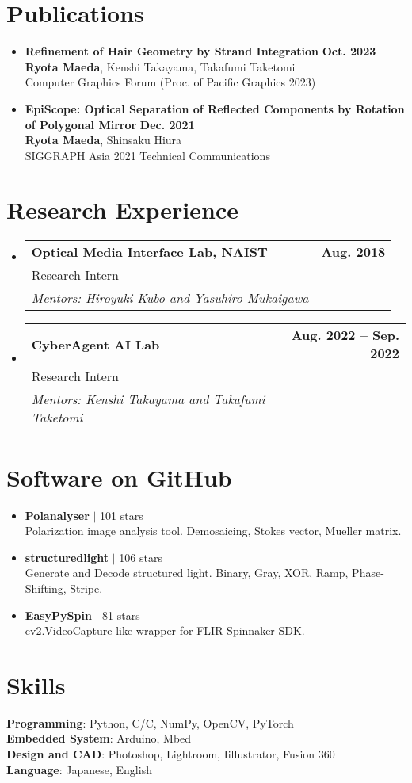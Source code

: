 \documentclass[letterpaper,11pt]{article}
\makeatletter
\newcommand{\resumeSubheadingWithAdvisor}[4]{
  \vspace{-2pt}\item
    \begin{tabular*}{1.0\textwidth}[t]{l@{\extracolsep{\fill}}r}
      \textbf{#1} & \textbf{\small #2} \\
      {\small#3} &  \\
      \textit{\small#4} &  \\
    \end{tabular*}\vspace{-7pt}
}
\newcommand{\resumePublicationHeading}[4]{
    \item 
    \small 
    \textbf{#1} \hfill \textbf{#2}\\
    #3\\
    #4 
}
\newcommand{\resumeSoftwareHeading}[3]{
    \item 
    \small 
    \textbf{#1} $|$ \raisebox{0.09\height}{\scriptsize \faIcon[regular]{star}\hspace{0.5ex}}#2 stars\\
    #3 
}
\newcommand{\resumeSubHeadingListStart}{\begin{itemize}[leftmargin=0.0in, label={}]}
\newcommand{\resumeSubHeadingListEnd}{\end{itemize}}
\makeatother
\begin{document}
\section{Publications}
    \resumeSubHeadingListStart
        \resumePublicationHeading
            {Refinement of Hair Geometry by Strand Integration}{Oct. 2023}
            {\textbf{Ryota Maeda}, Kenshi Takayama, Takafumi Taketomi}
            {Computer Graphics Forum (Proc. of Pacific Graphics 2023)}
        \resumePublicationHeading
            {EpiScope: Optical Separation of Reflected Components by Rotation of Polygonal Mirror}{Dec. 2021}
            {\textbf{Ryota Maeda}, Shinsaku Hiura}
            {SIGGRAPH Asia 2021 Technical Communications}
    \resumeSubHeadingListEnd

\section{Research Experience}
    \resumeSubHeadingListStart
        \resumeSubheadingWithAdvisor
            {Optical Media Interface Lab, NAIST}{Aug. 2018}
            {Research Intern}
            {Mentors: Hiroyuki Kubo and Yasuhiro Mukaigawa}
        \resumeSubheadingWithAdvisor
            {CyberAgent AI Lab}{Aug. 2022 -- Sep. 2022}
            {Research Intern}
            {Mentors: Kenshi Takayama and Takafumi Taketomi}
    \resumeSubHeadingListEnd

\section{Software on GitHub}
    \resumeSubHeadingListStart
        \resumeSoftwareHeading
            {Polanalyser}{101}
            {Polarization image analysis tool. Demosaicing, Stokes vector, Mueller matrix.}
        \resumeSoftwareHeading
            {structuredlight}{106}
            {Generate and Decode structured light. Binary, Gray, XOR, Ramp, Phase-Shifting, Stripe.}
        \resumeSoftwareHeading
            {EasyPySpin}{81}
            {cv2.VideoCapture like wrapper for FLIR Spinnaker SDK.}
    \resumeSubHeadingListEnd
\vspace{-15pt}


\section{Skills}
\small{
    \textbf{Programming}: Python, C/{C\nolinebreak[4]\hspace{-.05em}\raisebox{.4ex}{\tiny\bf ++}}, NumPy, OpenCV, PyTorch \\
    \textbf{Embedded System}: Arduino, Mbed \\
    \textbf{Design and CAD}: Photoshop, Lightroom, Iillustrator, Fusion 360 \\
    \textbf{Language}: Japanese, English 
}

\vspace{-16pt}
\end{document}
